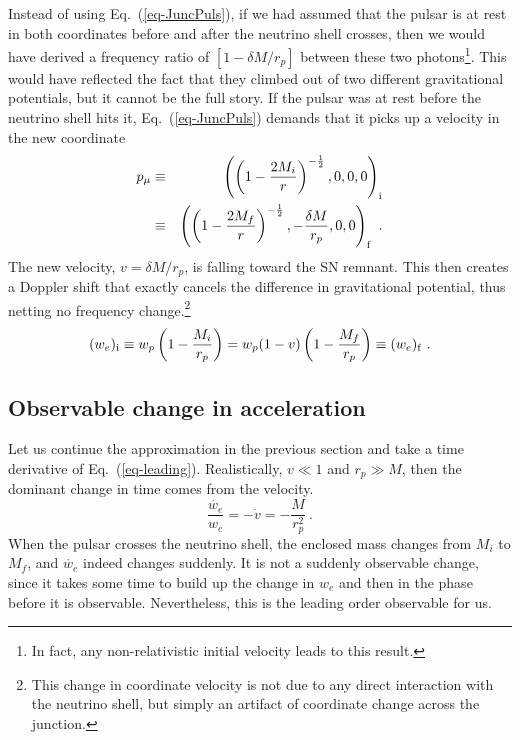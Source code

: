 \documentclass[aps,showpacs,onecolumn,floats,prd,superscriptaddress,nofootinbib]{revtex4}
\begin{document}
Instead of using Eq.~(\ref{eq-JuncPuls}), if we had assumed that the pulsar is at rest in both coordinates before and after the neutrino shell crosses, then we would have derived a frequency ratio of $[1-\delta M/r_p]$ between these two photons\footnote{In fact, any non-relativistic initial velocity leads to this result.}. This would have reflected the fact that they climbed out of two different gravitational potentials, but it cannot be the full story. If the pulsar was at rest before the neutrino shell hits it, Eq.~(\ref{eq-JuncPuls}) demands that it picks up a velocity in the new coordinate
 \begin{eqnarray}
p_\mu &\equiv& \left( \left( 1 - \frac{2M_i}{r} \right)^{-\frac{1}{2}}, 0, 0,0\right)_{\rm i} 
\label{eq-PulsarRest} \\ \nonumber  &\equiv&	
\left( \left( 1 - \frac{2M_f}{r} \right)^{-\frac{1}{2}}, -\frac{\delta M}{r_p},0,0 \right)_{\rm f}~.
\end{eqnarray}
The new velocity, $v=\delta M/r_p$, is falling toward the SN remnant. This then creates a Doppler shift that exactly cancels the difference in gravitational potential, thus netting no frequency change.\footnote{This change in coordinate velocity is not due to any direct interaction with the neutrino shell, but simply an artifact of coordinate change across the junction.}
\begin{equation}
(w_e)_{\rm i} \equiv w_p \left(1-\frac{M_i}{r_p}\right) = 
w_p (1-v)\left(1-\frac{M_f}{r_p}\right) \equiv (w_e)_{\rm f}~.
\label{eq-leading}
\end{equation}

\subsection{Observable change in acceleration}
\label{sec-acceleration}

Let us continue the approximation in the previous section and take a time derivative of Eq.~(\ref{eq-leading}). Realistically, $v \ll1$ and $r_p\gg M$, then the dominant change in time comes from the velocity.
\begin{equation}
\frac{\dot{w_e}}{w_e} = -\dot{v} = -\frac{M}{r_p^2}~.
\label{eq-AccChange}
\end{equation}
When the pulsar crosses the neutrino shell, the enclosed mass changes from $M_i$ to $M_f$, and $\dot{w_e}$ indeed changes suddenly. It is not a suddenly observable change, since it takes some time to build up the change in $w_e$ and then in the phase before it is observable. Nevertheless, this is the leading order observable for us.
\end{document}
